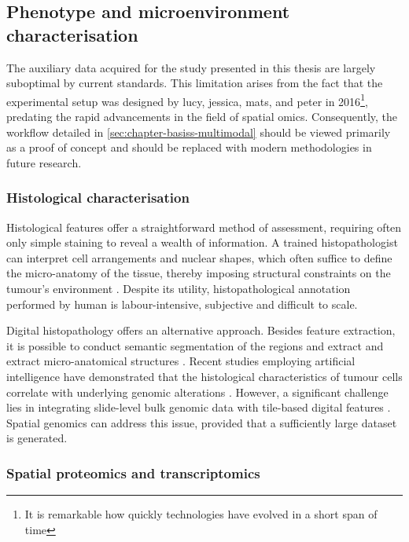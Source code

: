 \subsection{Phenotype and microenvironment characterisation}

The auxiliary data acquired for the study presented in this thesis are largely suboptimal by current standards. This limitation arises from the fact that the experimental setup was designed by \ac{lucy}, \ac{jessica}, \ac{mats}, and \ac{peter} in 2016\footnote{It is remarkable how quickly technologies have evolved in a short span of time}, predating the rapid advancements in the field of spatial omics. Consequently, the workflow detailed in \cref{sec:chapter-basiss-multimodal} should be viewed primarily as a proof of concept and should be replaced with modern methodologies in future research.

\subsubsection*{Histological characterisation}

Histological features offer a straightforward method of assessment, requiring often only simple staining to reveal a wealth of information. A trained histopathologist can interpret cell arrangements and nuclear shapes, which often suffice to define the micro-anatomy of the tissue, thereby imposing structural constraints on the tumour's environment . Despite its utility, histopathological annotation performed by human is labour-intensive, subjective and difficult to scale.

Digital histopathology offers an alternative approach. Besides feature extraction, it is possible to conduct semantic segmentation of the regions and extract and extract micro-anatomical structures \parencite{Kiemen2020-dc}. Recent studies employing artificial intelligence have demonstrated that the histological characteristics of tumour cells correlate with underlying genomic alterations \parencite{Fu2020-cp, Kather2020-bt}. However, a significant challenge lies in integrating slide-level bulk genomic data with tile-based digital features \parencite{Shmatko2022-to}. Spatial genomics can address this issue, provided that a sufficiently large dataset is generated.

\subsubsection*{Spatial proteomics and transcriptomics}

